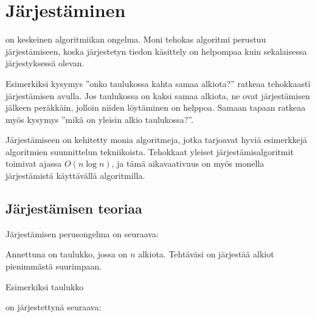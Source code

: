 \chapter{Järjestäminen}


on keskeinen algoritmiikan ongelma.
Moni tehokas algoritmi
perustuu järjestämiseen,
koska järjestetyn tiedon
käsittely on helpompaa
kuin sekalaisessa järjestyksessä olevan.

Esimerkiksi kysymys ''onko taulukossa kahta samaa
alkiota?'' ratkeaa tehokkaasti järjestämisen avulla.
Jos taulukossa on kaksi samaa alkiota,
ne ovat järjestämisen jälkeen peräkkäin,
jolloin niiden löytäminen on helppoa.
Samaan tapaan ratkeaa myös kysymys
''mikä on yleisin alkio taulukossa?''.

Järjestämiseen on kehitetty monia
algoritmeja, jotka tarjoavat hyviä
esimerkkejä algoritmien suunnittelun tekniikoista.
Tehokkaat yleiset järjestämis\-algoritmit
toimivat ajassa $O(n \log n)$, ja tämä aikavaativuus
on myös monella järjestämistä käyttävällä algoritmilla.

\section{Järjestämisen teoriaa}

Järjestämisen perusongelma on seuraava:
\begin{framed}
\noindent
Annettuna on taulukko, jossa on $n$ alkiota.
Tehtäväsi on järjestää alkiot pienimmästä
suurimpaan.
\end{framed}
\noindent
Esimerkiksi taulukko
\begin{center}
\end{center}
on järjestettynä seuraava:
\begin{center}
\end{center}

